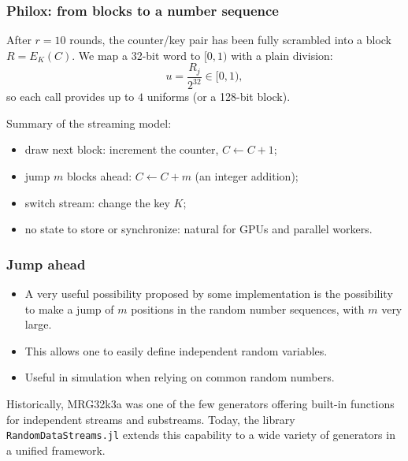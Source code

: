 \documentclass[aspectratio=169]{beamer}
\def\blue{\color{blue}}
\begin{document}
\begin{frame}
\frametitle{Philox: from blocks to a number sequence}

After $r = 10$ rounds, the counter/key pair has been fully scrambled into a block
$R = E_K(C)$. We map a 32-bit word to $[0,1)$ with a plain division:
\[
u = \frac{R_j}{2^{32}} \in [0,1),
\]
so each call provides up to $4$ uniforms (or a 128-bit block).

\vfill

Summary of the {\blue streaming model}:
\begin{itemize}
\item
draw next block: increment the counter, $C \leftarrow C + 1$;
\item
jump $m$ blocks ahead: $C \leftarrow C + m$ (an integer addition);
\item
switch stream: change the key $K$;
\item
no state to store or synchronize: natural for GPUs and parallel workers.
\end{itemize}

\end{frame}

\begin{frame}
\frametitle{Jump ahead}

\begin{itemize}
	\item 
A very useful possibility proposed by some implementation is the possibility to make a jump of $m$ positions in the random number sequences, with $m$ very large.
\item
This allows one to easily define independent random variables.
\item
Useful in simulation when relying on common random numbers.
\end{itemize}

Historically, MRG32k3a was one of the few generators offering built-in functions for independent streams and substreams. Today, the library \texttt{RandomDataStreams.jl} extends this capability to a wide variety of generators in a unified framework.

\end{frame}
\end{document}
